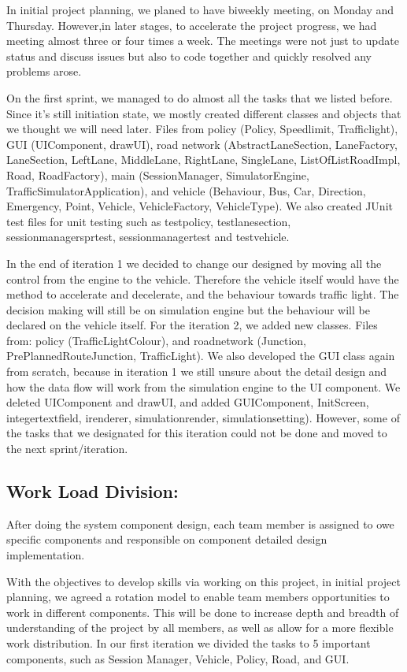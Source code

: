 \documentclass[11pt]{article}
\begin{document}
In initial project planning, we planed to have biweekly meeting, on Monday and Thursday. However,in later stages, to accelerate the project progress, we had meeting almost three or four times a week. The meetings were not just to update status and discuss issues but also to code together and quickly resolved any problems arose.

On the first sprint,  we managed to do almost all the tasks that we listed before. Since it's still initiation state, we mostly created different classes and objects that we thought we will need later. Files from policy (Policy, Speedlimit, Trafficlight), GUI (UIComponent, drawUI), road network (AbstractLaneSection, LaneFactory, LaneSection, LeftLane, MiddleLane, RightLane, SingleLane, ListOfListRoadImpl, Road, RoadFactory), main (SessionManager, SimulatorEngine, TrafficSimulatorApplication), and vehicle (Behaviour, Bus, Car, Direction, Emergency, Point, Vehicle, VehicleFactory, VehicleType). We also created JUnit test files for unit testing such as testpolicy, testlanesection, sessionmanagersprtest, sessionmanagertest and testvehicle. 

In the end of iteration 1 we decided to change our designed by moving all the control from the engine to the vehicle. Therefore the vehicle itself would have the method to accelerate and decelerate, and the behaviour towards traffic light. The decision making will still be on simulation engine but the behaviour will be declared on the vehicle itself. 
For the iteration 2, we added new classes. Files from: policy (TrafficLightColour), and roadnetwork (Junction, PrePlannedRouteJunction, TrafficLight). We also developed the GUI class again from scratch, because in iteration 1 we still unsure about the detail design and how the data flow will work from the simulation engine to the UI component. We deleted UIComponent and drawUI, and added GUIComponent, InitScreen, integertextfield, irenderer, simulationrender, simulationsetting). However, some of the tasks that we designated for this iteration could not be done and moved to the next sprint/iteration.  


\subsection{Work Load Division:}
After doing the system component design, each team member is assigned to owe specific components and responsible on component detailed design implementation. 


With the objectives to develop skills via working on this project, in initial project planning, we agreed a rotation model to enable team members opportunities to work in different components. This will be done to increase depth and breadth of understanding of the project by all members, as well as allow for a more flexible work distribution. In our first iteration we divided the tasks to 5 important components, such as Session Manager, Vehicle, Policy, Road, and GUI.
\end{document}
